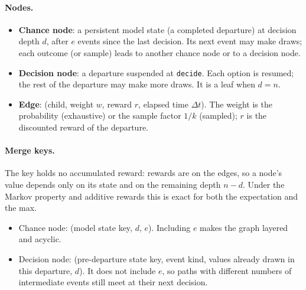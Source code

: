 \documentclass[11pt]{article}
\newcommand{\code}[1]{\texttt{#1}}
\theoremstyle{plain}
\begin{document}
\paragraph{Nodes.}
\begin{itemize}
\item \textbf{Chance node}: a persistent model state (a completed departure) at decision depth $d$, after $e$ events
  since the last decision. Its next event may make draws; each outcome (or sample) leads to another chance node or to
  a decision node.
\item \textbf{Decision node}: a departure suspended at \code{decide}. Each option is resumed; the rest of the
  departure may make more draws. It is a leaf when $d=n$.
\item \textbf{Edge}: (child, weight $w$, reward $r$, elapsed time $\Delta t$). The weight is the probability (exhaustive)
  or the sample factor $1/k$ (sampled); $r$ is the discounted reward of the departure.
\end{itemize}

\paragraph{Merge keys.} The key holds no accumulated reward: rewards are on the edges, so a node's value depends only
on its state and on the remaining depth $n-d$. Under the Markov property and additive rewards this is exact for both
the expectation and the max.
\begin{itemize}
\item Chance node: (model state key, $d$, $e$). Including $e$ makes the graph layered and acyclic.
\item Decision node: (pre-departure state key, event kind, values already drawn in this departure, $d$). It does not
  include $e$, so paths with different numbers of intermediate events still meet at their next decision.
\end{itemize}
\end{document}
